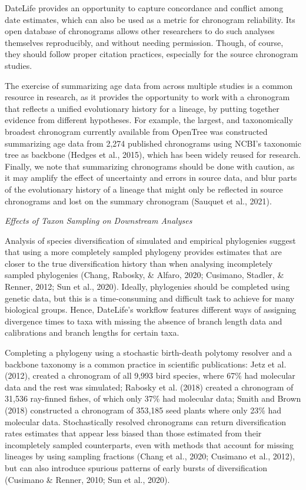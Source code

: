 \documentclass[english,man]{apa6}
\begin{document}
DateLife provides an opportunity to capture concordance and conflict among date estimates, which can also be used as a metric for chronogram reliability.
Its open database of chronograms allows other researchers to do such analyses themselves reproducibly, and without needing permission. Though, of course, they should follow proper citation practices, especially for the source chronogram studies.

The exercise of summarizing age data from across multiple studies is a common resource in research, as it provides the opportunity to work with a chronogram that reflects a unified evolutionary history for a lineage, by putting together evidence from different hypotheses. For example, the largest, and taxonomically broadest chronogram currently available from OpenTree was constructed summarizing age data from 2,274 published chronograms using NCBI's taxonomic tree as backbone (Hedges et al., 2015), which has been widely reused for research.
Finally, we note that summarizing chronograms should be done with caution, as it may amplify the effect of uncertainty and errors in source data, and blur parts of the evolutionary history of a lineage that might only be reflected in source chronograms and lost on the summary chronogram (Sauquet et al., 2021).

\begin{center}
\emph{Effects of Taxon Sampling on Downstream Analyses}
\end{center}

Analysis of species diversification of simulated and empirical phylogenies suggest that using a more completely sampled phylogeny provides estimates that are closer to the true diversification history than when analysing incompletely sampled phylogenies (Chang, Rabosky, \& Alfaro, 2020; Cusimano, Stadler, \& Renner, 2012; Sun et al., 2020).
Ideally, phylogenies should be completed using genetic data, but this is a time-consuming and difficult task to achieve for many biological groups.
Hence, DateLife's workflow features different ways of assigning divergence times to taxa with missing the absence of branch length data and calibrations and branch lengths for certain taxa.

Completing a phylogeny using a stochastic birth-death polytomy resolver and a backbone taxonomy is a common practice in scientific publications: Jetz et al. (2012), created a chronogram of all 9,993 bird species, where 67\% had molecular data and the rest was simulated; Rabosky et al. (2018) created a chronogram of 31,536 ray-finned fishes, of which only 37\% had molecular data; Smith and Brown (2018) constructed a chronogram of 353,185 seed plants where only 23\% had molecular data. Stochastically resolved chronograms can return diversification rates estimates that appear less biased than those estimated from their incompletely sampled counterparts, even with methods that account for missing lineages by using sampling fractions (Chang et al., 2020; Cusimano et al., 2012), but can also introduce spurious patterns of early bursts of diversification (Cusimano \& Renner, 2010; Sun et al., 2020).
\end{document}
